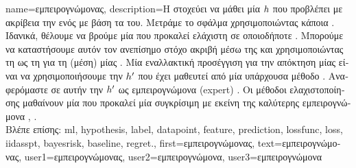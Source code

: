 {name={\foreignlanguage{greek}{εμπειρογνώμονας}},
	description={\foreignlanguage{greek}{Η}  \foreignlanguage{greek}{στοχεύει 
		να μάθει μία}  $h$ \foreignlanguage{greek}{που προβλέπει με ακρίβεια την}  
		\foreignlanguage{greek}{ενός}  \foreignlanguage{greek}{με βάση τα}  
		\foreignlanguage{greek}{του. Μετράμε το σφάλμα}  \foreignlanguage{greek}{χρησιμοποιώντας κάποια}  
		. \foreignlanguage{greek}{Ιδανικά, θέλουμε να βρούμε μία}  
		\foreignlanguage{greek}{που προκαλεί ελάχιστη}  \foreignlanguage{greek}{σε οποιοδήποτε}
		. \foreignlanguage{greek}{Μπορούμε να καταστήσουμε αυτόν τον ανεπίσημο στόχο ακριβή μέσω της}  
		 \foreignlanguage{greek}{και χρησιμοποιώντας τη}  \foreignlanguage{greek}{ως τη}  
		 \foreignlanguage{greek}{για τη (μέση})  \foreignlanguage{greek}{μίας} 
		. \foreignlanguage{greek}{Μία εναλλακτική προσέγγιση για την απόκτηση μίας}  
		\foreignlanguage{greek}{είναι να χρησιμοποιήσουμε την}  $h'$ \foreignlanguage{greek}{που έχει 
		μαθευτεί από μία υπάρχουσα μέθοδο} . \foreignlanguage{greek}{Αναφερόμαστε σε αυτήν την} 
		 $h'$ \foreignlanguage{greek}{ως εμπειρογνώμονα} (expert) \cite{PredictionLearningGames}. 
		\foreignlanguage{greek}{Οι μέθοδοι ελαχιστοποίησης}  \foreignlanguage{greek}{μαθαίνουν μία}  
		 \foreignlanguage{greek}{που προκαλεί μία}  \foreignlanguage{greek}{συγκρίσιμη με 
		εκείνη της καλύτερης εμπειρογνώμονα} \cite{PredictionLearningGames}, \cite{HazanOCO}.
					\\ 
		\foreignlanguage{greek}{Βλέπε επίσης:} \gls{ml}, \gls{hypothesis}, \gls{label}, \gls{datapoint}, \gls{feature}, \gls{prediction}, 
		\gls{lossfunc}, \gls{loss}, \gls{iidasspt}, \gls{bayesrisk}, \gls{baseline}, \gls{regret}.},
	first={\foreignlanguage{greek}{εμπειρογνώμονας}},
	text={\foreignlanguage{greek}{εμπειρογνώμονας}},
	user1={\foreignlanguage{greek}{εμπειρογνώμονας}}, %
  	user2={\foreignlanguage{greek}{εμπειρογνώμονα}}, %
	user3={\foreignlanguage{greek}{εμπειρογνώμονα}} %
}

